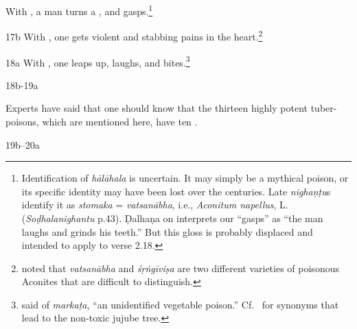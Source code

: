 \begin{translation}
    With , a man turns a , and
gasps.\footnote{Identification of \emph{hālāhala} is  uncertain. It may simply
be a mythical poison, or its specific identity may have been lost over the
centuries. Late \emph{nighaṇṭu}s identify it as \emph{stomaka} =
\emph{vatsanābha}, i.e., \emph{Aconitum napellus}, L. 
(\emph{Soḍhalanighantu}
p.43). Ḍalhaṇa on  interprets our “gasps” as “the man laughs
and grinds his teeth.”  But this gloss is probably displaced and intended to apply 
to verse 2.18.}


\item[ 17b] With , one gets violent
 and stabbing pains in the 
heart.\footnote{\citet[407]{sing-1972} noted that \emph{vatsanābha} and 
\emph{śṛṅgīviṣa} are two different varieties of poisonous Aconites that are 
difficult to distinguish.}
    
    \item[ 18a]
    With
    , one leaps up, laughs, and 
    bites.\footnote{\citet[299]{sing-1972} said of \emph{markaṭa}, “an 
    unidentified vegetable poison.”  Cf.\ \cite[v.36]{suve-2000} for synonyms that 
    lead to the non-toxic jujube tree.}
    
    
    \item[ 18b-19a]
    
    Experts have said that one should know that the thirteen highly potent 
    tuber-poisons, which are mentioned here, have ten .
    
    \item[ 19b--20a]
    

\end{translation}
